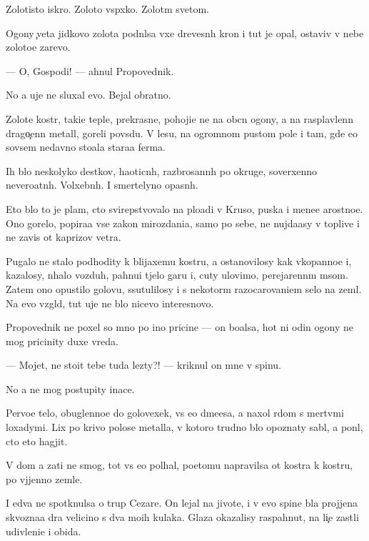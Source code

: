 \documentclass[10pt]{book}
\begin{document}
Zolotisto{\y} iskro{\y}. Zoloto{\y} vsp{\yi}xko{\y}. Zolot{\yi}m svetom.

Ogony {\c}veta jidkovo zolota podn{\ia}lsa v{\yi}xe drevesn{\yi}h kron i tut je opal, ostaviv v nebe zoloto{\y}e zarevo.

— O, Gospodi! — ahnul Propovednik.

No {\y}a uje ne sluxal {\y}evo. Bejal obratno.



Zolot{\yi}{\y}e kostr{\yi}, taki{\y}e tepl{\yi}{\y}e, prekrasn{\yi}{\y}e, pohoji{\y}e ne na ob{\yi}cn{\yi}{\y} ogony, a na rasplavlenn{\yi}{\y} drago{\c}enn{\yi}{\y} metall, goreli povs{\iu}du. V lesu, na ogromnom pustom pole i tam, gde {\y}e{\x}o sovsem nedavno sto{\y}ala stara{\y}a ferma.

Ih b{\yi}lo neskolyko des{\ia}tkov, haoticn{\yi}h, razbrosann{\yi}h po okruge, soverxenno nevero{\y}atn{\yi}h. Volxebn{\yi}h. I smertelyno opasn{\yi}h.

Eto b{\yi}lo to je plam{\ia}, cto svirepstvovalo na plo{\x}adi v Kruso, puska{\y} i mene{\y}e {\y}arostno{\y}e. Ono gorelo, popira{\y}a vse zakon{\yi} mirozdani{\y}a, samo po sebe, ne nujda{\y}asy v toplive i ne zavis{\ia} ot kaprizov vetra.

Pugalo ne stalo podhodity k blija{\y}xemu kostru, a ostanovilosy kak vkopanno{\y}e i, kazalosy, n{\iu}halo vozduh, pahnu{\x}i{\y} t{\ia}jelo{\y} gar{\y}u i, cuty ulovimo, perejarenn{\yi}m m{\ia}som. Zatem ono opustilo golovu, ssutulilosy i s nekotor{\yi}m razocarovani{\y}em selo na zeml{\iu}. Na {\y}evo vzgl{\ia}d, tut uje ne b{\yi}lo nicevo interesnovo.

Propovednik ne poxel so mno{\y} po ino{\y} pricine — on bo{\y}alsa, hot{\ia} ni odin ogony ne mog pricinity duxe vreda.

— Mojet, ne sto{\y}it tebe tuda lezty?! — kriknul on mne v spinu.

No {\y}a ne mog postupity inace.

Pervo{\y}e telo, obuglenno{\y}e do golovexek, vs{\e} {\y}e{\x}o d{\yi}m{\ia}{\x}e{\y}esa, {\y}a naxol r{\ia}dom s mertv{\yi}mi loxadymi. Lix po krivo{\y} polose metalla, v kotoro{\y} trudno b{\yi}lo opoznaty sabl{\iu}, {\y}a pon{\ia}l, cto eto hagjit.

V dom {\y}a za{\y}ti ne smog, tot vs{\e} {\y}e{\x}o pol{\yi}hal, poetomu napravilsa ot kostra k kostru, po v{\yi}jjenno{\y} zemle.

I {\y}edva ne spotknulsa o trup Cezare. On lejal na jivote, i v {\y}evo spine b{\yi}la projjena skvozna{\y}a d{\yi}ra velicino{\y} s dva mo{\y}ih kulaka. Glaza okazalisy raspahnut{\yi}, na li{\c}e zast{\yi}li udivleni{\y}e i obida.
\end{document}
